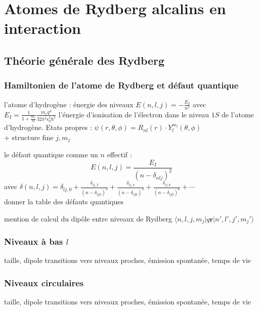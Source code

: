 \chapter{Atomes de Rydberg alcalins en interaction}
\label{chapter:Rydberg}

\section{Théorie générale des Rydberg}
	\subsection{Hamiltonien de l'atome de Rydberg et défaut quantique}
		\noindent l'atome d'hydrogène : énergie des niveaux $E(n,l,j)= - \frac{E_I}{n^2}$
		avec $E_I = \frac{1}{1+\frac{m_e}{M}}\frac{m_e q^4}{32\pi^2 \epsilon _0^2 \hbar ^2}$ l'énergie d'ionisation de l'électron dans le niveau $1S$ de l'atome d'hydrogène.
		Etats propres : $\psi(r,\theta,\phi) = R_{nl}(r)\cdot Y_l^{m_l}(\theta,\phi)$
		\\
		+ structure fine $j,m_j$
		\bigskip
		
		\noindent le défaut quantique comme un $n$ effectif : 
		\[
		E(n,l,j) = \frac{E_I}{(n-\delta_{nlj})^2}
		\]
		avec $\delta(n,l,j)=\delta_{lj,0} + \frac{\delta_{lj,2}}{(n-\delta_{lj0})^2} + \frac{\delta_{lj,4}}{(n-\delta_{lj0})^4} + \frac{\delta_{lj,6}}{(n-\delta_{lj0})^6} + \cdots$ \\
		donner la table des défauts quantiques
		\bigskip
		
		\noindent mention de calcul du dipôle entre niveaux de Rydberg $\langle n,l,j,m_j | q \mathbf{r} |n',l',j',m_j'\rangle$
		
	\subsection{Niveaux à bas $l$}
		\noindent taille, dipole
		\noindent transitions vers niveaux proches, émission spontanée, temps de vie
	\subsection{Niveaux circulaires}
		\noindent taille, dipole
		\noindent transitions vers niveaux proches, émission spontanée, temps de vie


